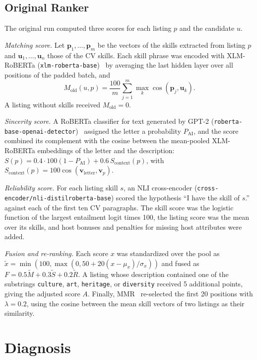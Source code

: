\documentclass[CHICAGO]{USG}
\begin{document}
\subsection{Original Ranker}
\label{sec:original}
The original run computed three scores for each listing $p$ and the candidate $u$.

\emph{Matching score.} Let $\mathbf{p}_1,\ldots,\mathbf{p}_m$ be the vectors of the skills extracted from listing $p$ and $\mathbf{u}_1,\ldots,\mathbf{u}_n$ those of the CV skills. Each skill phrase was encoded with XLM-RoBERTa (\texttt{xlm-roberta-base})~\citep{conneau2020} by averaging the last hidden layer over all positions of the padded batch, and
\begin{equation}
M_{\mathrm{old}}(u,p) = \frac{100}{m}\sum_{j=1}^{m}\max_{k}\cos(\mathbf{p}_j,\mathbf{u}_k).
\label{eq:mold}
\end{equation}
A listing without skills received $M_{\mathrm{old}}=0$.

\emph{Sincerity score.} A RoBERTa classifier for text generated by GPT-2 (\texttt{roberta-base-openai-detector})~\citep{solaiman2019} assigned the letter a probability $P_{\mathrm{AI}}$, and the score combined its complement with the cosine between the mean-pooled XLM-RoBERTa embeddings of the letter and the description: $S(p) = 0.4\cdot100(1-P_{\mathrm{AI}}) + 0.6\,S_{\mathrm{context}}(p)$, with $S_{\mathrm{context}}(p)=100\cos(\mathbf{v}_{\mathrm{letter}},\mathbf{v}_p)$. %

\emph{Reliability score.} For each listing skill $s$, an NLI cross-encoder (\texttt{cross-encoder/nli-distilroberta-base}) scored the hypothesis ``I have the skill of $s$.'' against each of the first ten CV paragraphs. The skill score was the logistic function of the largest entailment logit times 100, the listing score was the mean over its skills, and host bonuses and penalties for missing host attributes were added. %

\emph{Fusion and re-ranking.} Each score $x$ was standardized over the pool as $\tilde{x}=\min(100,\max(0,50+20(x-\mu_x)/\sigma_x))$ and fused as $F=0.5\tilde{M}+0.3\tilde{S}+0.2\tilde{R}$. A listing whose description contained one of the substrings \texttt{culture}, \texttt{art}, \texttt{heritage}, or \texttt{diversity} received 5 additional points, giving the adjusted score $A$. Finally, MMR~\citep{carbonell1998} re-selected the first 20 positions with $\lambda=0.2$, using the cosine between the mean skill vectors of two listings as their similarity. %

\section{Diagnosis}
\label{sec:diagnosis}
\end{document}
